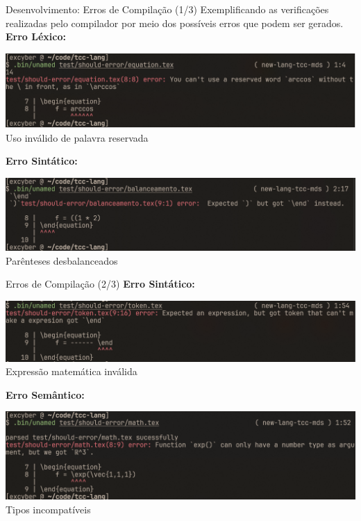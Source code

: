 \begin{frame}{Desenvolvimento: Erros de Compilação (1/3)}
    Exemplificando as verificações realizadas pelo compilador por meio dos possíveis erros que podem ser gerados. \\

       \textbf{Erro Léxico:}
       \begin{center}
           \includegraphics[width=\textwidth]{./Imagens/error-reserved-word.png}
           \small{Uso inválido de palavra reservada}
       \end{center}
       
       \textbf{Erro Sintático:}
       \begin{center}
           \includegraphics[width=\textwidth]{./Imagens/error-balanceamento.png}
           \small{Parênteses desbalanceados}
       \end{center}
\end{frame}

\begin{frame}{Erros de Compilação (2/3)}
       \textbf{Erro Sintático:}
       \begin{center}
           \includegraphics[width=\textwidth]{./Imagens/error-cant-make-expression.png}
           \small{Expressão matemática inválida}
       \end{center}
       
       \textbf{Erro Semântico:}
       \begin{center}
           \includegraphics[width=\textwidth]{./Imagens/error-incompatible-types.png}
           \small{Tipos incompatíveis}
       \end{center}
\end{frame}

